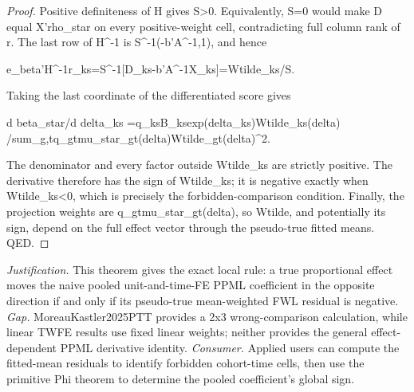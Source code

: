 \documentclass{article}
\begin{document}
\begin{proof}
Positive definiteness of H gives S>0. Equivalently, S=0 would make D equal X'rho_star on every positive-weight cell, contradicting full column rank of r. The last row of H^{-1} is S^{-1}(-b'A^{-1},1), and hence

  e_beta'H^{-1}r_{ks}=S^{-1}[D_{ks}-b'A^{-1}X_{ks}]=Wtilde_{ks}/S.

Taking the last coordinate of the differentiated score gives

  d beta_star/d delta_{ks}
  =q_{ks}B_{ks}exp(delta_{ks})Wtilde_{ks}(delta)
   /{sum_{g,t}q_{gt}mu_star_{gt}(delta)Wtilde_{gt}(delta)^2}.

The denominator and every factor outside Wtilde_{ks} are strictly positive. The derivative therefore has the sign of Wtilde_{ks}; it is negative exactly when Wtilde_{ks}<0, which is precisely the forbidden-comparison condition. Finally, the projection weights are q_{gt}mu_star_{gt}(delta), so Wtilde, and potentially its sign, depend on the full effect vector through the pseudo-true fitted means. QED.
\end{proof}
\par\smallskip\noindent \textit{Justification.} This theorem gives the exact local rule: a true proportional effect moves the naive pooled unit-and-time-FE PPML coefficient in the opposite direction if and only if its pseudo-true mean-weighted FWL residual is negative. \textit{Gap.} MoreauKastler2025PTT provides a 2x3 wrong-comparison calculation, while linear TWFE results use fixed linear weights; neither provides the general effect-dependent PPML derivative identity. \textit{Consumer.} Applied users can compute the fitted-mean residuals to identify forbidden cohort-time cells, then use the primitive Phi theorem to determine the pooled coefficient's global sign.
\end{document}
